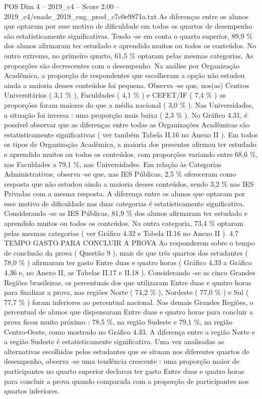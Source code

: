 \begin{textsample}{POS Dim 4 – 2019\_c4 – Score 2.00 – 2019\_c4/enade\_2019\_eng\_prod\_c7c0e9871a.txt}
As diferenças entre os alunos que optaram por esse motivo de dificuldade em todos os quartos de desempenho são estatisticamente significativas.
Tendo -se em conta o quarto superior, 89,9 \% dos alunos afirmaram ter estudado e aprendido muitos ou todos os conteúdos.
No outro extremo, no primeiro quarto, 61,5 \% optaram pelas mesmas categorias.
As proporções são decrescentes com o desempenho.
Na análise por Organização Acadêmica, a proporção de respondentes que escolheram a opção não estudou ainda a maioria desses conteúdos foi pequena.
Observa -se que, nos(as) Centros Universitários ( 3,1 \% ), Faculdades ( 4,1 \% ) e CEFET/IF ( 7,4 \% ) as proporções foram maiores do que a média nacional ( 3,0 \% ).
Nas Universidades, a situação foi inversa : uma proporção mais baixa ( 2,3 \% ).
No Gráfico 4.31, é possível observar que as diferenças entre todas as Organizações Acadêmicas são estatisticamente significativas ( ver também Tabela II.16 no Anexo II ).
Em todos os tipos de Organização Acadêmica, a maioria dos presentes afirmou ter estudado e aprendido muitos ou todos os conteúdos, com proporções variando entre 68,6 \%, nas Faculdades a 79,1 \%, nas Universidades.
Em relação às Categorias Administrativas, observa -se que, nas IES Públicas, 2,5 \% ofereceram como resposta que não estudou ainda a maioria desses conteúdos, sendo 3,2 \% nas IES Privadas com a mesma resposta.
A diferença entre os alunos que optaram por esse motivo de dificuldade nas duas categorias é estatisticamente significativa.
Considerando -se as IES Públicas, 81,9 \% dos alunos afirmaram ter estudado e aprendido muitos ou todos os conteúdos.
Na outra categoria, 73,4 \% optaram pelas mesmas categorias ( ver Gráfico 4.32 e Tabela II.16 no Anexo II ). 4.7 TEMPO GASTO PARA CONCLUIR A PROVA Ao responderem sobre o tempo de conclusão da prova ( Questão 9 ), mais de que três quartos dos estudantes ( 78,0 \% ) afirmaram ter gasto Entre duas e quatro horas ( Gráfico 4.33 a Gráfico 4.36 e, no Anexo II, as Tabelas II.17 e II.18 ).
Considerando -se as cinco Grandes Regiões brasileiras, os percentuais dos que utilizaram Entre duas e quatro horas para finalizar a prova, nas regiões Norte ( 74,2 \% ), Nordeste ( 77,0 \% ) e Sul ( 77,7 \% ) foram inferiores ao percentual nacional.
Nas demais Grandes Regiões, o percentual de alunos que dispensaram Entre duas e quatro horas para concluir a prova ficou muito próximo : 78,5 \%, na região Sudeste e 79,1 \%, na região Centro-Oeste, como mostrado no Gráfico 4.33.
A diferença entre a região Norte e a região Sudeste é estatisticamente significativa.
Uma vez analisadas as alternativas escolhidas pelos estudantes que se situam nos diferentes quartos de desempenho, observa -se uma tendência crescente : uma proporção maior de participantes no quarto superior declarou ter gasto Entre duas e quatro horas para concluir a prova quando comparada com a proporção de participantes nos quartos inferiores.

\end{textsample}
